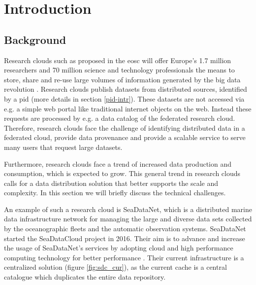 \section{Introduction}

\subsection{Background}
\label{introduction-background}

Research clouds such as proposed in the \gls{eosc} will offer Europe's 1.7 million researchers and 70 million science and technology professionals the means to store, share and re-use large volumes of information generated by the big data revolution \cite{eurocloud}. Research clouds publish datasets from distributed sources, identified by a \gls{pid} (more details in section \ref{pid-intr}). These datasets are not accessed via e.g. a simple web portal like traditional internet objects on the web. Instead these requests are processed by e.g. a data catalog of the federated research cloud. Therefore, research clouds face the challenge of identifying distributed data in a federated cloud, provide data provenance and provide a scalable service to serve many users that request large datasets.

Furthermore, research clouds face a trend of increased data production and consumption, which is expected to grow. This general trend in research clouds calls for a data distribution solution that better supports the scale and complexity. In this section we will briefly discuss the technical challenges.

An example of such a research cloud is SeaDataNet, which is a distributed marine data infrastructure network for managing the large and diverse data sets collected by the oceanographic fleets and the automatic observation systems. SeaDataNet started the SeaDataCloud project in 2016. Their aim is to advance and increase the usage of SeaDataNet's services by adopting cloud and high performance computing technology for better performance \cite{sdc}. Their current infrastructure is a centralized solution (figure \ref{fig:sdc_cur}), as the current cache is a central catalogue which duplicates the entire data repository.

